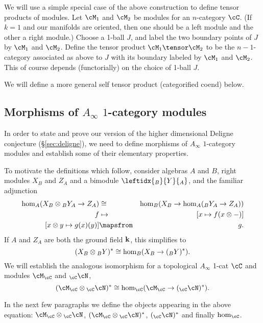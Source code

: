 \medskip

We will use a simple special case of the above 
construction to define tensor products 
of modules.
Let $\cM_1$ and $\cM_2$ be modules for an $n$-category $\cC$.
(If $k=1$ and our manifolds are oriented, then one should be 
a left module and the other a right module.)
Choose a 1-ball $J$, and label the two boundary points of $J$ by $\cM_1$ and $\cM_2$.
Define the tensor product $\cM_1 \tensor \cM_2$ to be the 
$n{-}1$-category associated as above to $J$ with its boundary labeled by $\cM_1$ and $\cM_2$.
This of course depends (functorially)
on the choice of 1-ball $J$.

We will define a more general self tensor product (categorified coend) below.


\subsection{Morphisms of $A_\infty$ $1$-category modules}
\label{ss:module-morphisms}

In order to state and prove our version of the higher dimensional Deligne conjecture
(\S\ref{sec:deligne}),
we need to define morphisms of $A_\infty$ $1$-category modules and establish
some of their elementary properties.

To motivate the definitions which follow, consider algebras $A$ and $B$, 
right modules $X_B$ and $Z_A$ and a bimodule $\leftidx{_B}{Y}{_A}$, and the familiar adjunction
\begin{eqnarray*}
	\hom_A(X_B\ot {_BY_A} \to Z_A) &\cong& \hom_B(X_B \to \hom_A( {_BY_A} \to Z_A)) \\
	f &\mapsto& [x \mapsto f(x\ot -)] \\
	{}[x\ot y \mapsto g(x)(y)] & \mapsfrom & g .
\end{eqnarray*}
If $A$ and $Z_A$ are both the ground field ${\bf k}$, this simplifies to
\[
	(X_B\otimes {_BY})^* \cong  \hom_B(X_B \to (_BY)^*) .
\]
We will establish the analogous isomorphism for a topological $A_\infty$ 1-cat $\cC$
and modules $\cM_\cC$ and $_\cC\cN$,
\[
	(\cM_\cC\ot {_\cC\cN})^* \cong  \hom_\cC(\cM_\cC \to (_\cC\cN)^*) .
\]

In the next few paragraphs we define the objects appearing in the above equation:
$\cM_\cC\ot {_\cC\cN}$, $(\cM_\cC\ot {_\cC\cN})^*$, $(_\cC\cN)^*$ and finally
$\hom_\cC$.


